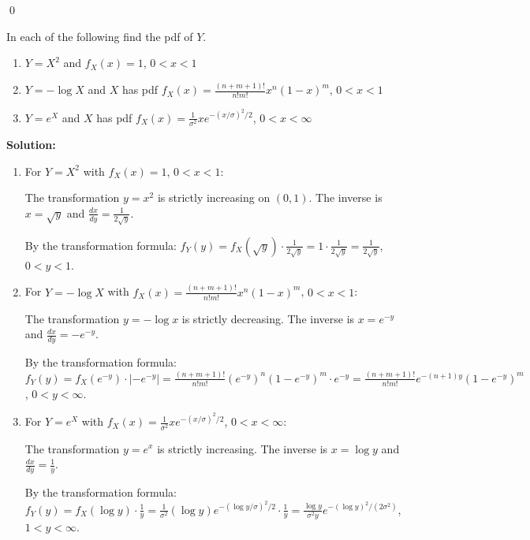 \qed
\begin{problembox}
In each of the following find the pdf of $Y$.
\begin{enumerate}[label=(\alph*)]
    \item $Y = X^2$ and $f_X(x) = 1$, $0 < x < 1$
    \item $Y = -\log X$ and $X$ has pdf $f_X(x) = \frac{(n+m+1)!}{n!m!} x^n(1-x)^m$, $0 < x < 1$
    \item $Y = e^X$ and $X$ has pdf $f_X(x) = \frac{1}{\sigma^2} xe^{-(x/\sigma)^2/2}$, $0 < x < \infty$
\end{enumerate}
\end{problembox}

\noindent\textbf{Solution:}
\begin{enumerate}[label=(\alph*)]
    \item For $Y = X^2$ with $f_X(x) = 1$, $0 < x < 1$:
    
    The transformation $y = x^2$ is strictly increasing on $(0,1)$. The inverse is $x = \sqrt{y}$ and $\frac{dx}{dy} = \frac{1}{2\sqrt{y}}$.
    
    By the transformation formula: $f_Y(y) = f_X(\sqrt{y}) \cdot \frac{1}{2\sqrt{y}} = 1 \cdot \frac{1}{2\sqrt{y}} = \frac{1}{2\sqrt{y}}$, $0 < y < 1$.
    
    \item For $Y = -\log X$ with $f_X(x) = \frac{(n+m+1)!}{n!m!} x^n(1-x)^m$, $0 < x < 1$:
    
    The transformation $y = -\log x$ is strictly decreasing. The inverse is $x = e^{-y}$ and $\frac{dx}{dy} = -e^{-y}$.
    
    By the transformation formula: $f_Y(y) = f_X(e^{-y}) \cdot |-e^{-y}| = \frac{(n+m+1)!}{n!m!} (e^{-y})^n(1-e^{-y})^m \cdot e^{-y} = \frac{(n+m+1)!}{n!m!} e^{-(n+1)y}(1-e^{-y})^m$, $0 < y < \infty$.
    
    \item For $Y = e^X$ with $f_X(x) = \frac{1}{\sigma^2} xe^{-(x/\sigma)^2/2}$, $0 < x < \infty$:
    
    The transformation $y = e^x$ is strictly increasing. The inverse is $x = \log y$ and $\frac{dx}{dy} = \frac{1}{y}$.
    
    By the transformation formula: $f_Y(y) = f_X(\log y) \cdot \frac{1}{y} = \frac{1}{\sigma^2} (\log y) e^{-(\log y/\sigma)^2/2} \cdot \frac{1}{y} = \frac{\log y}{\sigma^2 y} e^{-(\log y)^2/(2\sigma^2)}$, $1 < y < \infty$.
\end{enumerate}


